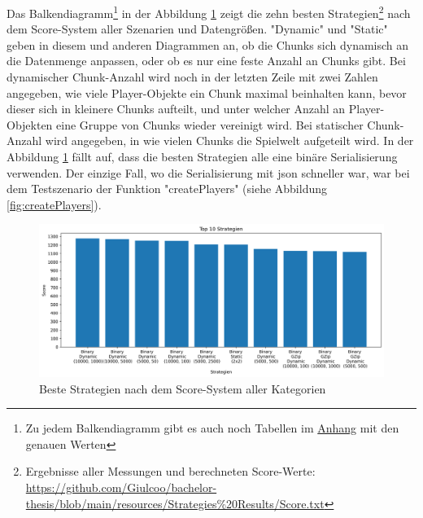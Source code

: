Das Balkendiagramm\footnote{Zu jedem Balkendiagramm gibt es auch noch Tabellen im \hyperref[ch:appendix]{Anhang} mit den genauen Werten} in der Abbildung \ref{fig:topStrat} zeigt die zehn besten Strategien\footnote{\label{stratScores}Ergebnisse aller Messungen und berechneten Score-Werte: \url{https://github.com/Giulcoo/bachelor-thesis/blob/main/resources/Strategies\%20Results/Score.txt}} nach dem Score-System aller Szenarien und Datengrößen. "Dynamic" und "Static" geben in diesem und anderen Diagrammen an, ob die Chunks sich dynamisch an die Datenmenge anpassen, oder ob es nur eine feste Anzahl an Chunks gibt. Bei dynamischer Chunk-Anzahl wird noch in der letzten Zeile mit zwei Zahlen angegeben, wie viele Player-Objekte ein Chunk maximal beinhalten kann, bevor dieser sich in kleinere Chunks aufteilt, und unter welcher Anzahl an Player-Objekten eine Gruppe von Chunks wieder vereinigt wird. Bei statischer Chunk-Anzahl wird angegeben, in wie vielen Chunks die Spielwelt aufgeteilt wird. In der Abbildung \ref{fig:topStrat} fällt auf, dass die besten Strategien alle eine binäre Serialisierung verwenden. Der einzige Fall, wo die Serialisierung mit \ac{json} schneller war, war bei dem Testszenario der Funktion "createPlayers" (siehe Abbildung \ref{fig:createPlayers}).

\begin{figure}[htp]
    \centering
    \includegraphics[width=1\textwidth]{images/plots/top.png}
    \caption{Beste Strategien nach dem Score-System aller Kategorien}
    \label{fig:topStrat}
\end{figure}

